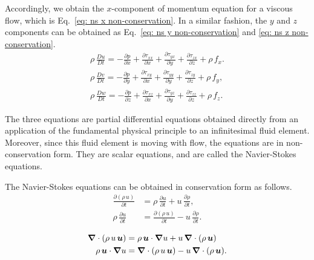 Accordingly, we obtain the $x$-component of momentum equation for a viscous flow, which is Eq.~\eqref{eq: ns x non-conservation}. In a similar fashion, the $y$ and $z$ components can be obtained as Eq.~\eqref{eq: ns y non-conservation} and \eqref{eq: ns z non-conservation}.
\begin{subequations}
\begin{align}
    \rho \, \frac{Du}{Dt}
    = -\frac{\partial p}{\partial x}
    +\frac{\partial \tau_{xx}}{\partial x}
    +\frac{\partial \tau_{yx}}{\partial y}
    +\frac{\partial \tau_{zx}}{\partial z}
    + \rho\, f_x. 
    \label{eq: ns x non-conservation} \\
    \rho \, \frac{Dv}{Dt}
    = -\frac{\partial p}{\partial y}
    +\frac{\partial \tau_{xy}}{\partial x}
    +\frac{\partial \tau_{yy}}{\partial y}
    +\frac{\partial \tau_{zy}}{\partial z}
    + \rho\, f_y, 
    \label{eq: ns y non-conservation} \\
    \rho \, \frac{Dw}{Dt}
    = -\frac{\partial p}{\partial z}
    +\frac{\partial \tau_{xz}}{\partial x}
    +\frac{\partial \tau_{yz}}{\partial y}
    +\frac{\partial \tau_{zz}}{\partial z}
    + \rho\, f_z. 
    \label{eq: ns z non-conservation} 
\end{align}
\label{eq: ns non-conservation} 
\end{subequations}

The three equations are partial differential equations obtained directly from an application of the fundamental physical principle to an infinitesimal fluid element. 
Moreover, since this fluid element is moving with flow, the equations are in non-conservation form. 
They are scalar equations, and are called the Navier-Stokes equations. 

The Navier-Stokes equations can be obtained in conservation form as follows. 
\begin{equation}
\begin{aligned}
    \frac{\partial (\rho \, u)}{\partial t} 
    &= \rho\, \frac{\partial u}{\partial t}
    + u\, \frac{\partial \rho}{\partial t}, \\
    \rho\, \frac{\partial u}{\partial t} 
    &= \frac{\partial (\rho \, u)}{\partial t} 
    - u\, \frac{\partial \rho}{\partial t}. 
    \label{eq: ns trans 1}
\end{aligned}
\end{equation}

\begin{equation}
\begin{aligned}
    \grad\cdot (\rho\, u \, \bm{u}) 
    &= \rho \, \bm{u} \cdot \grad u
    + u\,\grad\cdot (\rho\,\bm{u}) \\
    \rho \, \bm{u} \cdot \grad u
    &= \grad\cdot (\rho\,u\, \bm{u}) 
    - u\,\grad\cdot (\rho\,\bm{u}). 
    \label{eq: ns trans 2}
\end{aligned}
\end{equation}

